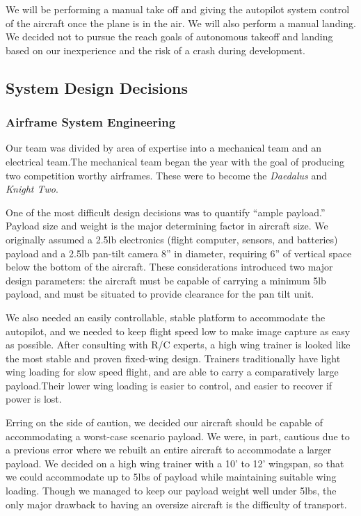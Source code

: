 \documentclass[pdftex,10pt,letter]{article}
\begin{document}
We will be performing a manual take off and giving the autopilot system control of the aircraft once the plane is in the air. We will also perform a manual landing. We decided not to pursue the reach goals of autonomous takeoff and landing based on our inexperience and the risk of a crash during development.
\subsection{System Design Decisions}
\subsubsection{Airframe System Engineering}

Our team was divided by area of expertise into a mechanical team and an electrical team.The mechanical team began the year with the goal of producing two competition worthy airframes. These were to become the \emph{Daedalus} and \emph{Knight Two}.

One of the most difficult design decisions was to quantify ``ample payload.'' Payload size and weight is the major determining factor in aircraft size.  We originally assumed a 2.5lb electronics (flight computer, sensors, and batteries) payload and a 2.5lb pan-tilt camera 8'' in diameter, requiring 6'' of vertical space below the bottom of the aircraft. These considerations introduced two major design parameters: the aircraft must be capable of carrying a minimum 5lb payload, and must be situated to provide clearance for the pan tilt unit.

We also needed an easily controllable, stable platform to accommodate the autopilot, and we needed to keep flight speed low to make image capture as easy as possible. After consulting with R/C experts, a high wing trainer is looked like the most stable and proven fixed-wing design. Trainers traditionally have light wing loading for slow speed flight, and are able to carry a comparatively large payload.Their lower wing loading is easier to control, and easier to recover if power is lost. 

Erring on the side of caution, we decided our aircraft should be capable of accommodating a worst-case scenario payload. 
We were, in part, cautious due to a previous error where we rebuilt an entire aircraft to accommodate a larger payload.
We decided on a high wing trainer with a 10' to 12' wingspan, so that we could accommodate up to 5lbs of payload while maintaining suitable wing loading.
Though we managed to keep our payload weight well under 5lbs, the only major drawback to having an oversize aircraft is the difficulty of transport.
\end{document}
